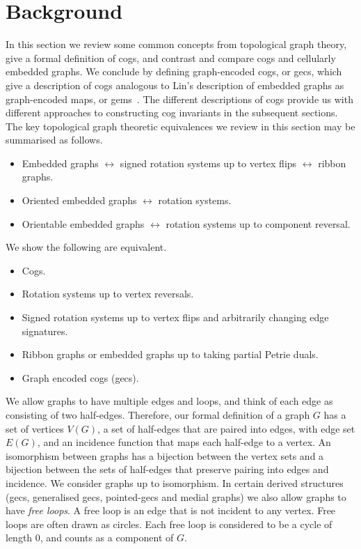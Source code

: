 \documentclass{amsart}
\theoremstyle{definition}
\theoremstyle{remark}
\numberwithin{equation}{section}
\begin{document}
\section{Background}\label{sec:back}

In this section we review some common concepts from topological graph theory, give a formal definition of cogs, and contrast and compare cogs and cellularly embedded graphs. We conclude by defining {graph-encoded cogs}, or {gecs}, which give a description of cogs analogous to Lin's description of embedded graphs as graph-encoded maps, or gems~\cite{zbMATH03728291}. The different descriptions of cogs provide us with different approaches to constructing cog invariants in the subsequent sections. 
The key topological graph theoretic equivalences we review in this section may be summarised as follows.
\begin{itemize}
\item Embedded graphs  $\leftrightarrow$ signed rotation systems up to vertex flips $\leftrightarrow$ ribbon graphs.
\item Oriented embedded graphs $\leftrightarrow$ rotation systems.
\item Orientable embedded graphs $\leftrightarrow$ rotation systems up to component reversal.
\end{itemize}
We show the following are equivalent. 
\begin{itemize}
\item Cogs.
\item  Rotation systems up to vertex reversals.
\item Signed rotation systems up to vertex flips and  arbitrarily changing edge signatures.
\item Ribbon graphs or embedded graphs up to taking partial Petrie duals.
\item Graph encoded cogs (gecs).
\end{itemize}




\medskip


We allow graphs to have multiple edges and loops, and think of each edge as consisting of two half-edges.
Therefore, our formal definition of a graph $G$ has a set of vertices $V(G)$, a set of half-edges that are paired into edges, with edge set $E(G)$, and an incidence function that maps each half-edge to a vertex.
An isomorphism between graphs has a bijection between the vertex sets and a bijection between the sets of half-edges that preserve pairing into edges and incidence.  We consider graphs up to isomorphism.
In certain derived structures (gecs, generalised gecs, pointed-gecs and medial graphs) we also allow graphs to have \emph{free loops}. A free loop is an edge that is not incident to any vertex.  Free loops are often drawn as circles.
Each free loop is considered to be a cycle of length $0$, and counts as a component of $G$.
\end{document}
